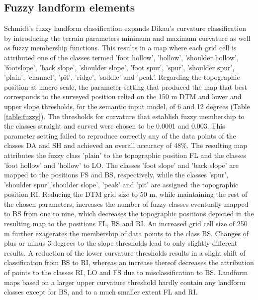 \documentclass[preprint,12pt,authoryear]{elsarticle}
\begin{document}
\subsection{Fuzzy landform elements}
Schmidt's fuzzy landform classification expands Dikau's curvature classification by introducing the terrain parameters minimum and maximum curvature as well as fuzzy membership functions. This results in a map where each grid cell is attributed one of the classes termed 'foot hollow', 'hollow', 'shoulder hollow', 'footslope', 'back slope', 'shoulder slope', 'foot spur', 'spur', 'shoulder spur', 'plain', 'channel', 'pit', 'ridge', 'saddle' and 'peak'.
Regarding the topographic position at macro scale, the parameter setting that produced the map that best corresponds to the surveyed position relied on the 150 m DTM and lower and upper slope thresholds, for the semantic input model, of 6 and 12 degrees (Table \ref{table:fuzzy}). The thresholds for curvature that establish fuzzy membership to the classes straight and curved were chosen to be 0.0001 and 0.003. This parameter setting failed to reproduce correctly any of the data points of the classes DA and SH and achieved an overall accuracy of 48\%. The resulting map attributes the fuzzy class 'plain' to the topographic position FL and the classes 'foot hollow' and 'hollow' to LO. The classes 'foot slope' and 'back slope' are mapped to the positions FS and BS, respectively, while the classes 'spur', 'shoulder spur','shoulder slope', 'peak' and 'pit' are assigned the topographic position RI. Reducing the DTM grid size to 50 m, while maintaining the rest of the chosen parameters, increases the number of fuzzy classes eventually mapped to BS from one to nine, which decreases the topographic positions depicted in the resulting map to the positions FL, BS and RI. An increased grid cell size of 250 m further exagerates the membership of data points to the class BS. Changes of plus or minus 3 degrees to the slope thresholds lead to only slightly different results. A reduction of the lower curvature thresholds results in a slight shift of classification from BS to RI, whereas an increase thereof decreases the attribution of points to the classes RI, LO and FS due to misclassification to BS. Landform maps based on a larger upper curvature threshold hardly contain any landform classes except for BS, and to a much smaller extent FL and RI.
\end{document}
